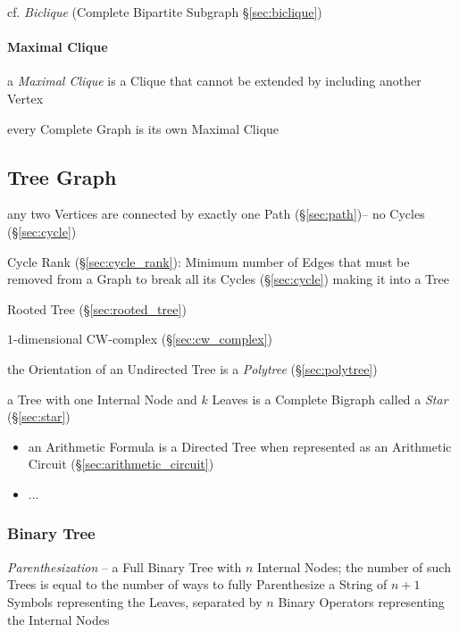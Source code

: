 cf. \emph{Biclique} (Complete Bipartite Subgraph \S\ref{sec:biclique})



\paragraph{Maximal Clique}\label{sec:maximal_clique}\hfill

a \emph{Maximal Clique} is a Clique that cannot be extended by including
another Vertex

every Complete Graph is its own Maximal Clique



\subsection{Tree Graph}\label{sec:tree_graph}

any two Vertices are connected by exactly one Path (\S\ref{sec:path})-- no
Cycles (\S\ref{sec:cycle})

Cycle Rank (\S\ref{sec:cycle_rank}): Minimum number of Edges that must be
removed from a Graph to break all its Cycles (\S\ref{sec:cycle}) making it into
a Tree

Rooted Tree (\S\ref{sec:rooted_tree})

$1$-dimensional CW-complex (\S\ref{sec:cw_complex})

the Orientation of an Undirected Tree is a \emph{Polytree}
(\S\ref{sec:polytree})

a Tree with one Internal Node and $k$ Leaves is a Complete Bigraph called a
\emph{Star} (\S\ref{sec:star})

\begin{itemize}
  \item an Arithmetic Formula is a Directed Tree when represented as an
    Arithmetic Circuit (\S\ref{sec:arithmetic_circuit})
  \item ...
\end{itemize}



\subsubsection{Binary Tree}\label{sec:binary_tree}

\emph{Parenthesization} -- a Full Binary Tree with $n$ Internal Nodes; the
number of such Trees is equal to the number of ways to fully Parenthesize a
String of $n+1$ Symbols representing the Leaves, separated by $n$ Binary
Operators representing the Internal Nodes



